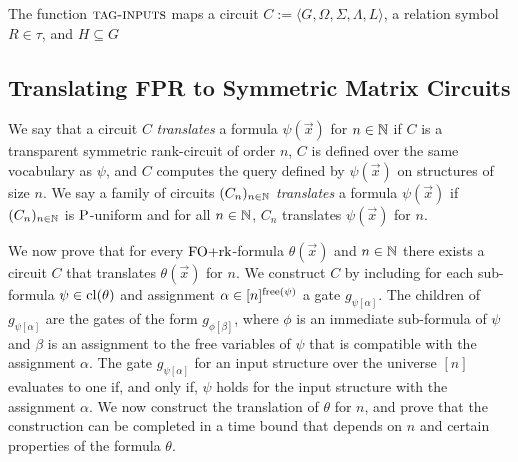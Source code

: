 \documentclass[../paper.tex]{subfiles}
\begin{document}
\begin{definition}
  The function ${\normalfont\textsc{tag-inputs}}$ maps a circuit $C := \langle G, \Omega, \Sigma,
  \Lambda, L \rangle$, a relation symbol $R \in \tau$, and $H \subseteq G$
\end{definition}

\subsection{Translating FPR to Symmetric Matrix Circuits}

We say that a circuit $C$ \emph{translates} a formula $\psi(\vec{x})$ for $n \in
\mathbb{N}$ if $C$ is a transparent symmetric rank-circuit of order $n$, $C$ is
defined over the same vocabulary as $\psi$, and $C$ computes the query defined
by $\psi(\vec{x})$ on structures of size $n$. We say a family of circuits
$(C_n)_{n \in \mathbb{N}}$ \emph{translates} a formula $\psi (\vec{x})$ if $(C_n)_{n
  \in \mathbb{N}}$ is $\mathrm{P}$-uniform and for all $n \in \mathbb{N}$, $C_n$ translates
$\psi(\vec{x})$ for $n$.

We now prove that for every $\text{\upshape FO+rk}$-formula $\theta(\vec{x})$ and $n \in \mathbb{N}$
there exists a circuit $C$ that translates $\theta(\vec{x})$ for $n$. We
construct $C$ by including for each sub-formula $\psi \in \mathrm{cl}(\theta)$ and
assignment $\alpha \in [n]^{\mathrm{free}(\psi)}$ a gate $g_{\psi[\alpha]}$. The
children of $g_{\psi[\alpha]}$ are the gates of the form $g_{\phi[\beta]}$,
where $\phi$ is an immediate sub-formula of $\psi$ and $\beta$ is an assignment
to the free variables of $\psi$ that is compatible with the assignment $\alpha$.
The gate $g_{\psi[\alpha]}$ for an input structure over the universe $[n]$
evaluates to one if, and only if, $\psi$ holds for the input structure with the
assignment $\alpha$. We now construct the translation of $\theta$ for $n$, and
prove that the construction can be completed in a time bound that depends on $n$
and certain properties of the formula $\theta$.
\end{document}
